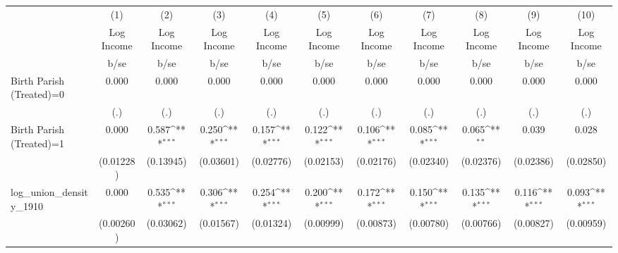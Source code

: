 {
\def\sym#1{\ifmmode^{#1}\else\(^{#1}\)\fi}
\begin{tabular}{l*{10}{c}}
\hline\hline
                    &\multicolumn{1}{c}{(1)}&\multicolumn{1}{c}{(2)}&\multicolumn{1}{c}{(3)}&\multicolumn{1}{c}{(4)}&\multicolumn{1}{c}{(5)}&\multicolumn{1}{c}{(6)}&\multicolumn{1}{c}{(7)}&\multicolumn{1}{c}{(8)}&\multicolumn{1}{c}{(9)}&\multicolumn{1}{c}{(10)}\\
                    &\multicolumn{1}{c}{Log Income}&\multicolumn{1}{c}{Log Income}&\multicolumn{1}{c}{Log Income}&\multicolumn{1}{c}{Log Income}&\multicolumn{1}{c}{Log Income}&\multicolumn{1}{c}{Log Income}&\multicolumn{1}{c}{Log Income}&\multicolumn{1}{c}{Log Income}&\multicolumn{1}{c}{Log Income}&\multicolumn{1}{c}{Log Income}\\
                    &        b/se         &        b/se         &        b/se         &        b/se         &        b/se         &        b/se         &        b/se         &        b/se         &        b/se         &        b/se         \\
\hline
Birth Parish (Treated)=0&       0.000         &       0.000         &       0.000         &       0.000         &       0.000         &       0.000         &       0.000         &       0.000         &       0.000         &       0.000         \\
                    &         (.)         &         (.)         &         (.)         &         (.)         &         (.)         &         (.)         &         (.)         &         (.)         &         (.)         &         (.)         \\
Birth Parish (Treated)=1&       0.000         &       0.587\sym{***}&       0.250\sym{***}&       0.157\sym{***}&       0.122\sym{***}&       0.106\sym{***}&       0.085\sym{***}&       0.065\sym{**} &       0.039         &       0.028         \\
                    &   (0.01228)         &   (0.13945)         &   (0.03601)         &   (0.02776)         &   (0.02153)         &   (0.02176)         &   (0.02340)         &   (0.02376)         &   (0.02386)         &   (0.02850)         \\
log\_union\_density\_1910&       0.000         &       0.535\sym{***}&       0.306\sym{***}&       0.254\sym{***}&       0.200\sym{***}&       0.172\sym{***}&       0.150\sym{***}&       0.135\sym{***}&       0.116\sym{***}&       0.093\sym{***}\\
                    &   (0.00260)         &   (0.03062)         &   (0.01567)         &   (0.01324)         &   (0.00999)         &   (0.00873)         &   (0.00780)         &   (0.00766)         &   (0.00827)         &   (0.00959)         \\

\end{tabular}}

